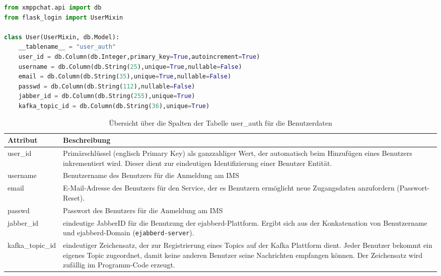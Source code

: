 \documentclass[a4paper,titlepage,halfparskip,12pt]{scrreprt}
\begin{document}
\begin{lstlisting}[language=python, caption={SQLAlchemy Schema für die Tabelle der Benutzerdaten}, label={lst:classUser}]
from xmppchat.api import db
from flask_login import UserMixin

class User(UserMixin, db.Model):
    __tablename__ = "user_auth"
    user_id = db.Column(db.Integer,primary_key=True,autoincrement=True)
    username = db.Column(db.String(25),unique=True,nullable=False)
    email = db.Column(db.String(35),unique=True,nullable=False)
    passwd = db.Column(db.String(112),nullable=False)
    jabber_id = db.Column(db.String(255),unique=True)
    kafka_topic_id = db.Column(db.String(36),unique=True)

\end{lstlisting}


\begin{table}[h]
\centering
\caption{Übersicht über die Spalten der Tabelle user\_auth für die Benutzerdaten}
\begin{tabular}{|l|p{}|}
\hline
\textbf{Attribut} & \textbf{Beschreibung} \\
\hline
user\_id & Primärschlüssel (englisch Primary Key) als ganzzahliger Wert, der automatisch beim Hinzufügen eines Benutzers inkrementiert wird. Dieser dient zur eindeutigen Identifizierung einer Benutzer Entität.\\
\hline
username & Benutzername des Benutzers für die Anmeldung am \acs{IMS}\\
\hline
email & E-Mail-Adresse des Benutzers für den Service, der es Benutzern ermöglicht neue Zugangsdaten anzufordern (Passwort-Reset).\\
\hline
passwd & Passwort des Benutzers für die Anmeldung am \acs{IMS}\\
\hline
jabber\_id & eindeutige JabberID für die Benutzung der ejabberd-Plattform. Ergibt sich aus der Konkatenation von Benutzername und ejabberd-Domain (\texttt{ejabberd-server}).\\
\hline
kafka\_topic\_id & eindeutiger Zeichensatz, der zur Registrierung eines Topics auf der Kafka Plattform dient. Jeder Benutzer bekommt ein eigenes Topic zugeordnet, damit keine anderen Benutzer seine Nachrichten empfangen können. Der Zeichensatz wird zufällig im Programm-Code erzeugt.\\
\hline
\end{tabular}
\label{tab:descriptionUserClass}
\end{table}
\end{document}
